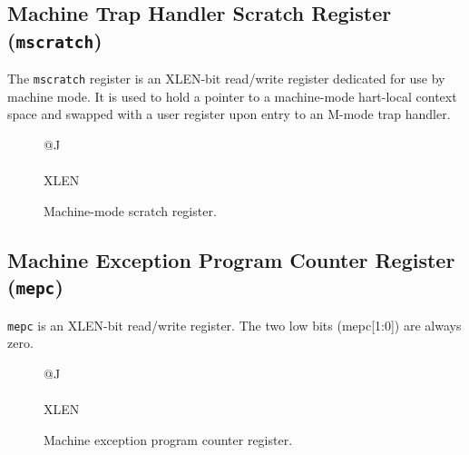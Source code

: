 \fi

\subsection{Machine Trap Handler Scratch Register
(\texttt{mscratch})}\label{machine-trap-handler-scratch-register-mscratch}

The \texttt{mscratch} register is an XLEN-bit read/write register dedicated for
use by machine mode. It is used to hold a pointer to a machine-mode
hart-local context space and swapped with a user register upon entry to
an M-mode trap handler.

\ifdefined\MARKDOWN
\else

\begin{figure}[htb]
	{\footnotesize
		\begin{center}
			\begin{tabular}{@{}J}
				 \\
				\hline
				 \\
				\hline
				XLEN \\
			\end{tabular}
		\end{center}
	}
	\vspace{-0.1in}
	\caption{Machine-mode scratch register.}
	\label{fig:mscratchreg}
\end{figure}

\fi

\subsection{Machine Exception Program Counter Register
(\texttt{mepc})}\label{machine-exception-program-counter-register-mepc}

\texttt{mepc} is an XLEN-bit read/write register. The two low bits
(mepc[1:0]) are always zero.

\ifdefined\MARKDOWN
\else

\begin{figure}[htb]
	{\footnotesize
		\begin{center}
			\begin{tabular}{@{}J}
				\instbitrange{XLEN-1}{0} \\
				\hline
				\multicolumn{1}{|c|}{\texttt{mepc}} \\
				\hline
				XLEN \\
			\end{tabular}
		\end{center}
	}
	\vspace{-0.1in}
	\caption{Machine exception program counter register.}
	\label{fig:mepcreg}
\end{figure}

